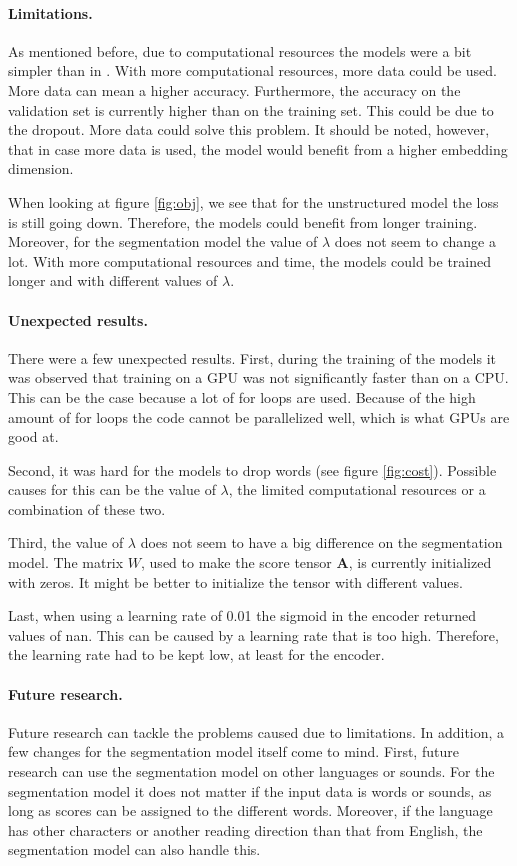 \paragraph{Limitations.}
As mentioned before, due to computational resources the models were a bit simpler than in .
With more computational resources, more data could be used.
More data can mean a higher accuracy. 
Furthermore, the accuracy on the validation set is currently higher than on the training set. 
This could be due to the dropout. 
More data could solve this problem.
It should be noted, however, that in case more data is used, the model would benefit from a higher embedding dimension.

When looking at figure \ref{fig:obj}, we see that for the unstructured model the loss is still going down. 
Therefore, the models could benefit from longer training. 
Moreover, for the segmentation model the value of $\lambda$ does not seem to change a lot.
With more computational resources and time, the models could be trained longer and with different values of $\lambda$.

\paragraph{Unexpected results.}
There were a few unexpected results.
First, during the training of the models it was observed that training on a GPU was not significantly faster than on a CPU. 
This can be the case because a lot of for loops are used. 
Because of the high amount of for loops the code cannot be parallelized well, which is what GPUs are good at.

Second, it was hard for the models to drop words (see figure \ref{fig:cost}).
Possible causes for this can be the value of $\lambda$, the limited computational resources or a combination of these two. 

Third, the value of $\lambda$ does not seem to have a big difference on the segmentation model. 
The matrix $W$, used to make the score tensor $\boldsymbol{A}$, is currently initialized with zeros. 
It might be better to initialize the tensor with different values.

Last, when using a learning rate of 0.01 the sigmoid in the encoder returned values of nan. 
This can be caused by a learning rate that is too high. 
Therefore, the learning rate had to be kept low, at least for the encoder. 

\paragraph{Future research.}
Future research can tackle the problems caused due to limitations. 
In addition, a few changes for the segmentation model itself come to mind.
First, future research can use the segmentation model on other languages or sounds.
For the segmentation model it does not matter if the input data is words or sounds, as long as scores can be assigned to the different words.
Moreover, if the language has other characters or another reading direction than that from English, the segmentation model can also handle this.

